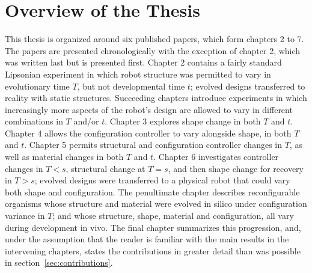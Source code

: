 \section{Overview of the Thesis}
This thesis is organized around six published papers, which form chapters 2 to 7.
The papers are presented chronologically with the exception of chapter 2, which was written last but is presented first.
Chapter 2 contains a fairly standard Lipsonian experiment in which robot structure was permitted to vary in evolutionary time $T$, but not developmental time $t$; evolved designs transferred to reality with static structures.
Succeeding chapters introduce experiments in which increasingly more aspects of the robot's design are allowed to vary in different combinations in $T$ and/or $t$.
Chapter 3 explores shape change in both $T$ and $t$.
Chapter 4 allows the configuration controller to vary alongside shape, in both $T$ and $t$.
Chapter 5 permits structural and configuration controller changes in $T$, as well as material changes in both $T$ and $t$.
Chapter 6 investigates controller changes in $T<s$, structural change at $T=s$, and then shape change for recovery in $T>s$; evolved designs were transferred to a physical robot that could vary both shape and configuration.
The penultimate chapter describes reconfigurable organisms whose structure and material were evolved in silico under configuration variance in $T$; and whose structure, shape, material and configuration, all vary during development in vivo.
The final chapter summarizes this progression,
and, under the assumption that the reader is familiar with the main results in the intervening chapters, states the contributions in greater detail than was possible in section~\ref{sec:contributions}.


